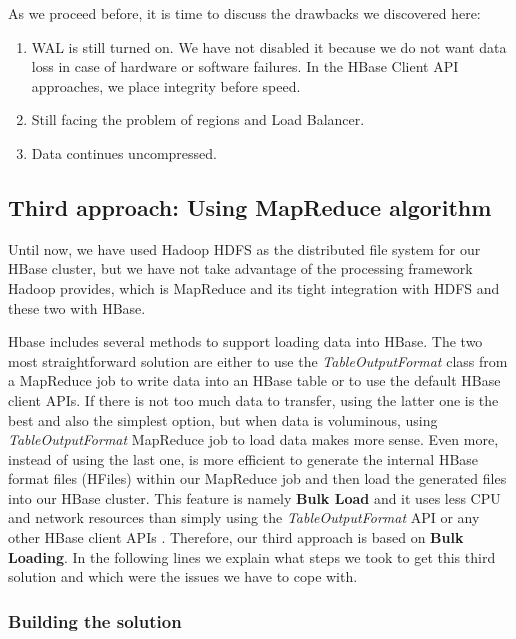 \bigskip

As we proceed before, it is time to discuss the drawbacks we discovered here:
\begin{enumerate}
\item WAL is still turned on. We have not disabled it because we do not want data loss in case of hardware or software failures. In the HBase Client API approaches, we place integrity before speed.

\item Still facing the problem of regions and Load Balancer.

\item Data continues uncompressed.
\end{enumerate}


\subsection{Third approach: Using MapReduce algorithm}


Until now, we have used Hadoop HDFS as the distributed file system for our HBase cluster, but we have not take advantage of the processing framework Hadoop provides, which is MapReduce and its tight integration with HDFS and these two with HBase.
\par
Hbase includes several methods to support loading data into HBase. The two most straightforward solution are either to use the \textit{TableOutputFormat} class from a MapReduce job to write data into an HBase table or to use the default HBase client APIs. If there is not too much data to transfer, using the latter one is the best and also the simplest option, but when data is voluminous, using \textit{TableOutputFormat} MapReduce job to load data makes more sense. Even more, instead of using the last one, is more efficient to generate the internal HBase format files (HFiles) within our MapReduce job and then load the generated files into our HBase cluster. This feature is namely \textbf{Bulk Load} and it uses less CPU and network resources than simply using the \textit{TableOutputFormat} API or any other HBase client APIs \cite{ApacheHBaseBulkLoad}. Therefore, our third approach is based on \textbf{Bulk Loading}. In the following lines we explain what steps we took to get this third solution and which were the issues we have to cope with.

\subsubsection{Building the solution}

